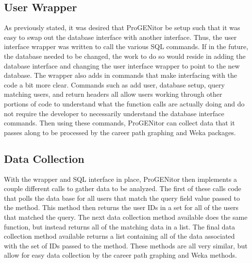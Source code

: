 \subsection{User Wrapper}
As previously stated, it was desired that ProGENitor be setup such that it was
easy to swap out the database interface with another interface.  Thus, the user
interface wrapper was written to call the various SQL commands.  If in the
future, the database needed to be changed, the work to do so would reside in
adding the database interface and changing the user interface wrapper to point
to the new database.  The wrapper also adds in commands that make interfacing
with the code a bit more clear.  Commands such as add user, database
setup, query matching users, and return headers all allow users working through
other portions of code to understand what the function calls are actually doing
and do not require the developer to necessarily understand the database
interface commands.  Then using these commands, ProGENitor can collect data that
it passes along to be processed by the career path graphing and Weka packages.

\subsection{Data Collection}
With the wrapper and SQL interface in place, ProGENitor then implements a couple
different calls to gather data to be analyzed.  The first of these calls code
that polls the data base for all users that match the query field value passed
to the method.  This method then returns the user IDs in a set for all of the
users that matched the query.  The next data collection method available does
the same function, but instead returns all of the matching data in a list.  The
final data collection method available returns a list containing all of the
data associated with the set of IDs passed to the method.  These methods are all
very similar, but allow for easy data collection by the career path graphing and
Weka methods.
